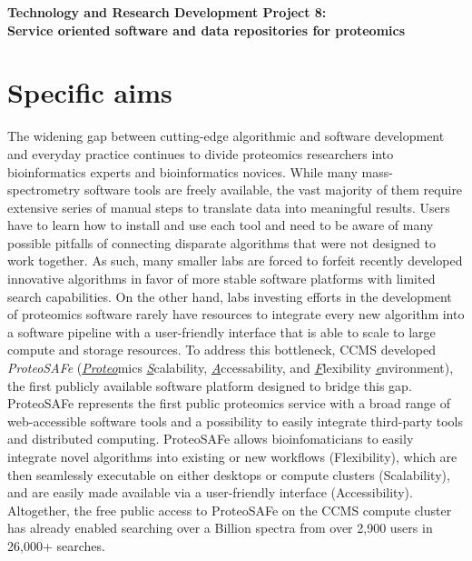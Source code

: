 \documentclass[arial,11pt]{article}
\begin{document}

\begin{center}
{\Large {\bf Technology and Research Development Project 8: \\
Service oriented software and data repositories for proteomics}}
\end{center}

\section{Specific aims}
The widening gap between cutting-edge algorithmic and software development and everyday practice continues to divide proteomics researchers into bioinformatics experts and bioinformatics novices. While many mass-spectrometry software tools are freely available, the vast majority of them require extensive series of manual steps to translate data into meaningful results. Users have to learn how to install and use each tool and need to be aware of many possible pitfalls of connecting disparate algorithms that were not designed to work together.  As such, many smaller labs  are forced to forfeit recently developed innovative algorithms in favor of more stable software platforms with limited search capabilities. On the other hand, labs investing efforts in the development of proteomics  software rarely have resources to integrate every new algorithm into a software pipeline with a user-friendly interface that is able to scale to large compute and storage resources. To address this bottleneck, CCMS developed {\em ProteoSAFe} (\underline{\em Proteo}mics \underline{\em S}calability, \underline{\em A}ccessability, and \underline{\em F}lexibility \underline{\em e}nvironment), the first publicly available software platform designed to bridge this gap. ProteoSAFe represents the first public proteomics service with a broad range of web-accessible software tools and a possibility to easily integrate third-party tools and distributed computing. ProteoSAFe allows bioinfomaticians to easily integrate novel algorithms into existing or new workflows (Flexibility), which are then seamlessly executable on either desktops  or compute clusters (Scalability), and are easily made available  via a user-friendly interface (Accessibility). Altogether, the free public access to ProteoSAFe on the CCMS compute cluster has already enabled searching over a Billion spectra from over 2,900 users in 26,000+ searches.
\end{document}

